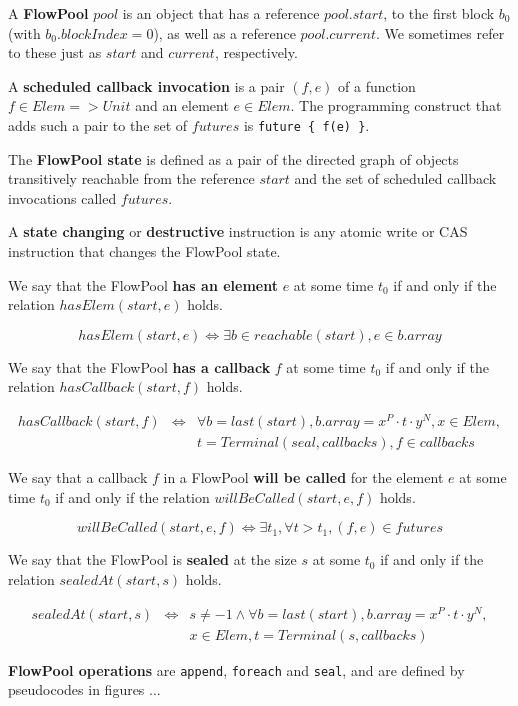 \documentclass[runningheads,a4paper]{llncs}
\begin{document}
\begin{definition}[FlowPool]
A \textbf{FlowPool} $pool$ is an object that
has a reference $pool.start$, to the first block $b_0$ (with $b_0.blockIndex=0$), 
as well as a reference $pool.current$.
We sometimes refer to these just as $start$ and $current$, respectively.

A \textbf{scheduled callback invocation} is a pair $(f, e)$ of a function
$f \in Elem => Unit$ and an element $e \in Elem$.
The programming construct that adds such a pair to the set of
$futures$ is \verb=future { f(e) }=.

The \textbf{FlowPool state} is defined as a pair of the directed graph of
objects transitively reachable from the reference $start$ and the set
of scheduled callback invocations called $futures$.

A \textbf{state changing} or \textbf{destructive} instruction is any
atomic write or CAS instruction that changes the FlowPool state.

We say that the FlowPool \textbf{has an element} $e$ at some time
$t_0$ if and only if the relation $hasElem(start, e)$ holds.

\begin{equation*}
hasElem(start, e) \Leftrightarrow \exists b \in reachable(start), e
\in b.array
\end{equation*}

We say that the FlowPool \textbf{has a callback} $f$ at some time
$t_0$ if and only if the relation $hasCallback(start, f)$ holds.

\begin{eqnarray*}
hasCallback(start, f) &\Leftrightarrow& \forall b = last(start), b.array
= x^P \cdot t \cdot y^N, x \in Elem, \\
& & t = Terminal(seal, callbacks), f \in callbacks
\end{eqnarray*}

We say that a callback $f$ in a FlowPool \textbf{will be called} for
the element $e$ at some time $t_0$ if and only if the relation
$willBeCalled(start, e, f)$ holds.

\begin{equation*}
willBeCalled(start, e, f) \Leftrightarrow \exists t_1, \forall t >
t_1, (f, e) \in futures
\end{equation*}

We say that the FlowPool is \textbf{sealed} at the size $s$ at some
$t_0$ if and only if the relation $sealedAt(start, s)$ holds.

\begin{eqnarray*}
sealedAt(start, s) &\Leftrightarrow& s \neq -1 \wedge \forall b = last(start), b.array
= x^P \cdot t \cdot y^N, \\
& &x \in Elem, t = Terminal(s, callbacks)
\end{eqnarray*}

\textbf{FlowPool operations} are \verb=append=, \verb=foreach= and
\verb=seal=, and are defined by pseudocodes in figures ...
\end{definition}
\end{document}
